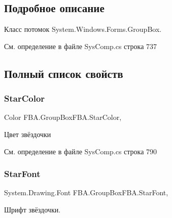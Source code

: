 \subsection{Подробное описание}
Класс потомок System.\+Windows.\+Forms.\+Group\+Box. 



См. определение в файле Sys\+Comp.\+cs строка 737



\subsection{Полный список свойств}
\mbox{\label{class_f_b_a_1_1_group_box_f_b_a_ae51565b1f8ec16b73998bb695b07afd8}} 
\subsubsection{\texorpdfstring{Star\+Color}{StarColor}}
{\footnotesize\ttfamily Color F\+B\+A.\+Group\+Box\+F\+B\+A.\+Star\+Color\hspace{0.3cm}{\ttfamily [get]}, {\ttfamily [set]}}



Цвет звёздочки 



См. определение в файле Sys\+Comp.\+cs строка 790

\mbox{\label{class_f_b_a_1_1_group_box_f_b_a_a84c9123f86225450374d1186c0f78872}} 
\subsubsection{\texorpdfstring{Star\+Font}{StarFont}}
{\footnotesize\ttfamily System.\+Drawing.\+Font F\+B\+A.\+Group\+Box\+F\+B\+A.\+Star\+Font\hspace{0.3cm}{\ttfamily [get]}, {\ttfamily [set]}}



Шрифт звёздочки. 



